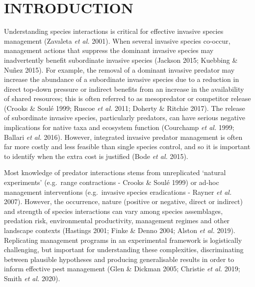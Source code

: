 \documentclass[]{elsarticle} %
\begin{document}
\parskip=12pt

\newpage

\hypertarget{introduction}{%
\section{INTRODUCTION}\label{introduction}}

Understanding species interactions is critical for effective invasive species management (Zavaleta \emph{et al.} 2001). When several invasive species co-occur, management actions that suppress the dominant invasive species may inadvertently benefit subordinate invasive species (Jackson 2015; Kuebbing \& Nuñez 2015). For example, the removal of a dominant invasive predator may increase the abundance of a subordinate invasive species due to a reduction in direct top-down pressure or indirect benefits from an increase in the availability of shared resources; this is often referred to as mesopredator or competitor release (Crooks \& Soulé 1999; Ruscoe \emph{et al.} 2011; Doherty \& Ritchie 2017). The release of subordinate invasive species, particularly predators, can have serious negative implications for native taxa and ecosystem function (Courchamp \emph{et al.} 1999; Ballari \emph{et al.} 2016). However, integrated invasive predator management is often far more costly and less feasible than single species control, and so it is important to identify when the extra cost is justified (Bode \emph{et al.} 2015).

Most knowledge of predator interactions stems from unreplicated `natural experiments' (e.g.~range contractions - Crooks \& Soulé 1999) or ad-hoc management interventions (e.g.~invasive species eradications - Rayner \emph{et al.} 2007). However, the occurrence, nature (positive or negative, direct or indirect) and strength of species interactions can vary among species assemblages, predation risk, environmental productivity, management regimes and other landscape contexts (Hastings 2001; Finke \& Denno 2004; Alston \emph{et al.} 2019). Replicating management programs in an experimental framework is logistically challenging, but important for understanding these complexities, discriminating between plausible hypotheses and producing generalisable results in order to inform effective pest management (Glen \& Dickman 2005; Christie \emph{et al.} 2019; Smith \emph{et al.} 2020).
\end{document}
